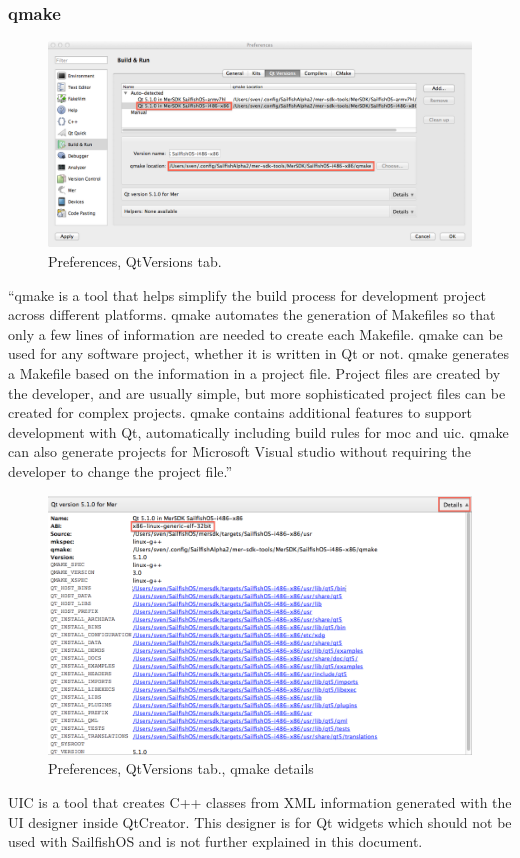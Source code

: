 \subsubsection{qmake}\label{subsubsec:qmake}
%
\begin{figure}[H]
  \centering
  \includegraphics[scale=0.35]{../media/gfx/QtCreator/QtCreatorQtVersions.png} 
  \caption{Preferences, QtVersions tab.}
  \label{fig:qmake486pref}
\end{figure}
%
``qmake is a tool that helps simplify the build process for development project across different platforms. qmake automates the generation of Makefiles so that only a few lines of information are needed to create each Makefile. qmake can be used for any software project, whether it is written in Qt or not.
qmake generates a Makefile based on the information in a project file. Project files are created by the developer, and are usually simple, but more sophisticated project files can be created for complex projects. qmake contains additional features to support development with Qt, automatically including build rules for moc and uic. qmake can also generate projects for Microsoft Visual studio without requiring the developer to change the project file.''\cite{qt03}
%
\begin{figure}[H]
  \centering
  \includegraphics[scale=0.45]{../media/gfx/QtCreator/qmakedetails.png} 
  \caption{Preferences, QtVersions tab., qmake details}
  \label{fig:qmakedetailspref}
\end{figure}
%
UIC is a tool that creates C++ classes from XML information generated with the UI designer inside QtCreator. This designer is for Qt widgets which should not be used with SailfishOS and is not further explained in this document.

